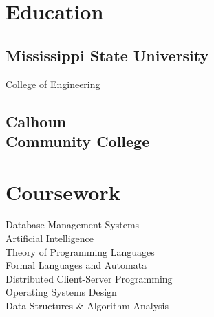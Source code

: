 \documentclass[]{deedy-resume-openfont}
\begin{document}
\begin{minipage}[t]{0.33\textwidth}

\section{Education}

\subsection{Mississippi State University}
College of Engineering \\

\sectionsep

\subsection{Calhoun\\Community College}

\sectionsep

\section{Coursework}
Database Management Systems \\
Artificial Intelligence \\
Theory of Programming Languages \\
Formal Languages and Automata \\
Distributed Client-Server Programming \\
Operating Systems Design \\
Data Structures \& Algorithm Analysis \\


\end{minipage}
\end{document}
